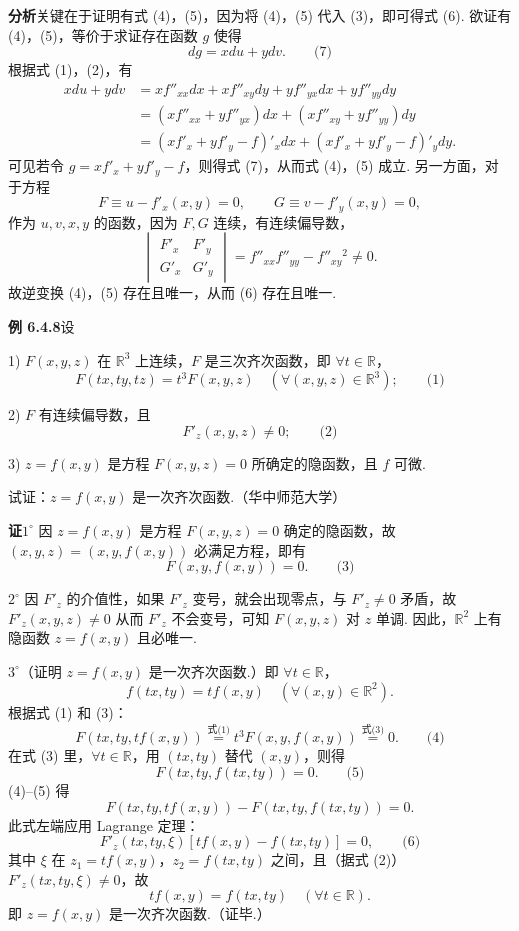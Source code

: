 \documentclass[UTF8, 12pt, fontset=fandol, oneside]{ctexart}
\begin{document}
\noindent\textbf{分析}\quad 关键在于证明有式 (4)，(5)，因为将 (4)，(5) 代入 (3)，即可得式 (6). 欲证有 (4)，(5)，等价于求证存在函数 $g$ 使得
\[
  dg=xdu+ydv. \qquad\text{(7)}
\]
根据式 (1)，(2)，有
\[
\begin{aligned}
  xdu+ydv
  &=
  x f''_{xx}dx+xf''_{xy}dy+yf''_{yx}dx+yf''_{yy}dy \\
  &=(xf''_{xx}+yf''_{yx})dx+(xf''_{xy}+yf''_{yy})dy \\
  &=(xf'_x+yf'_y-f)'_x dx+(xf'_x+yf'_y-f)'_y dy.
\end{aligned}
\]
可见若令 $g=xf'_x+yf'_y-f$，则得式 (7)，从而式 (4)，(5) 成立. 另一方面，对于方程
\[
  F\equiv u-f'_x(x,y)=0,\qquad
  G\equiv v-f'_y(x,y)=0,
\]
作为 $u,v,x,y$ 的函数，因为 $F,G$ 连续，有连续偏导数，
\[
  \begin{vmatrix}
    F'_x & F'_y\\
    G'_x & G'_y
  \end{vmatrix}
  =
  f''_{xx}f''_{yy}-f''_{xy}{}^2\ne0.
\]
故逆变换 (4)，(5) 存在且唯一，从而 (6) 存在且唯一.

\noindent\textbf{例 6.4.8}\quad 设

1) $F(x,y,z)$ 在 $\mathbb R^3$ 上连续，$F$ 是三次齐次函数，即 $\forall t\in\mathbb R$，
\[
  F(tx,ty,tz)=t^3F(x,y,z)\quad(\forall (x,y,z)\in\mathbb R^3); \qquad\text{(1)}
\]

2) $F$ 有连续偏导数，且
\[
  F'_z(x,y,z)\ne0; \qquad\text{(2)}
\]

3) $z=f(x,y)$ 是方程 $F(x,y,z)=0$ 所确定的隐函数，且 $f$ 可微.

\noindent 试证：$z=f(x,y)$ 是一次齐次函数.（华中师范大学）

\noindent\textbf{证}\quad $1^\circ$ 因 $z=f(x,y)$ 是方程 $F(x,y,z)=0$ 确定的隐函数，故 $(x,y,z)=(x,y,f(x,y))$ 必满足方程，即有
\[
  F(x,y,f(x,y))=0. \qquad\text{(3)}
\]

$2^\circ$ 因 $F'_z$ 的介值性，如果 $F'_z$ 变号，就会出现零点，与 $F'_z\ne0$ 矛盾，故 $F'_z(x,y,z)\ne0$ 从而 $F'_z$ 不会变号，可知 $F(x,y,z)$ 对 $z$ 单调. 因此，$\mathbb R^2$ 上有隐函数 $z=f(x,y)$ 且必唯一.

$3^\circ$（证明 $z=f(x,y)$ 是一次齐次函数.）即 $\forall t\in\mathbb R$，
\[
  f(tx,ty)=tf(x,y)\quad(\forall(x,y)\in\mathbb R^2).
\]
根据式 (1) 和 (3)：
\[
  F(tx,ty,tf(x,y))\overset{\text{式(1)}}{=}t^3F(x,y,f(x,y))
  \overset{\text{式(3)}}{=}0. \qquad\text{(4)}
\]
在式 (3) 里，$\forall t\in\mathbb R$，用 $(tx,ty)$ 替代 $(x,y)$，则得
\[
  F(tx,ty,f(tx,ty))=0. \qquad\text{(5)}
\]
(4)--(5) 得
\[
  F(tx,ty,tf(x,y))-F(tx,ty,f(tx,ty))=0.
\]
此式左端应用 Lagrange 定理：
\[
  F'_z(tx,ty,\xi)[tf(x,y)-f(tx,ty)]=0, \qquad\text{(6)}
\]
其中 $\xi$ 在 $z_1=tf(x,y)$，$z_2=f(tx,ty)$ 之间，且（据式 (2)）$F'_z(tx,ty,\xi)\ne0$，故
\[
  tf(x,y)=f(tx,ty)\quad(\forall t\in\mathbb R).
\]
即 $z=f(x,y)$ 是一次齐次函数.（证毕.）
\end{document}

